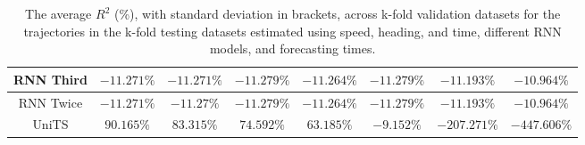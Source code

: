 \begin{table}[!ht]
{\begin{tabular}{|c|c|c|c|c|c|c|c|}
			RNN Third & $-11.271\%$ & $-11.271\%$ & $-11.279\%$ & $-11.264\%$ & $-11.279\%$ & $-11.193\%$ & $-10.964\%$ \\ \hline
			RNN Twice & $-11.271\%$ & $-11.27\%$ & $-11.279\%$ & $-11.264\%$ & $-11.279\%$ & $-11.193\%$ & $-10.964\%$ \\ \hline
			UniTS & $90.165\%$ & $83.315\%$ & $74.592\%$ & $63.185\%$ & $-9.152\%$ & $-207.271\%$ & $-447.606\%$ \\ \hline
		\end{tabular}
	}
	\caption{The average $R^{2}$ (\%), with standard deviation in brackets, across k-fold validation datasets for the trajectories in the k-fold testing datasets estimated using speed, heading, and time, different RNN models, and forecasting times.}
	\label{tab:all_speed_actual_dir_R2}
\end{table}

